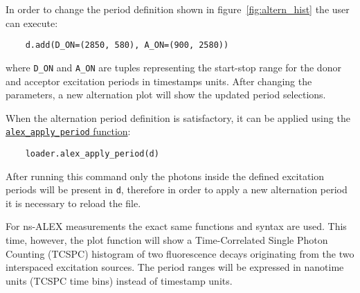 In order to change the period definition shown in figure~\ref{fig:altern_hist}
the user can execute:

\begin{verbatim}
    d.add(D_ON=(2850, 580), A_ON=(900, 2580))
\end{verbatim}

where \verb|D_ON| and \verb|A_ON| are tuples representing 
the start-stop range for the donor and acceptor excitation periods 
in timestamps units. After changing the parameters, a new alternation plot will show the updated period selections.

When the alternation period definition is satisfactory, it can
be applied using the 
\href{http://fretbursts.readthedocs.org/en/latest/loader.html#fretbursts.loader.alex_apply_period}{\texttt{alex\_apply\_period} function}:

\begin{verbatim}
    loader.alex_apply_period(d)
\end{verbatim}

After running this command only the photons inside the defined excitation periods
will be present in \verb|d|, therefore in order to apply a new alternation period 
it is necessary to reload the file.

For ns-ALEX measurements the exact same functions and syntax are used.
This time, however, the plot function will show a Time-Correlated Single Photon Counting (TCSPC) histogram of two fluorescence decays originating from the two interspaced excitation sources. The period ranges will be expressed in nanotime units (TCSPC time bins) instead of 
timestamp units.
